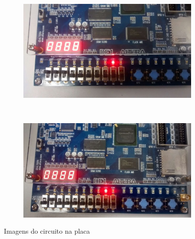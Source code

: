 \begin{figure}
	\begin{subfigure}[b]{0.44\textwidth}
        \includegraphics[width=\textwidth]{img/cenario2/circ7}
        \label{fig:circ7}
    \end{subfigure}
    ~
    \begin{subfigure}[b]{0.44\textwidth}
        \includegraphics[width=\textwidth]{img/cenario2/circ8}
        \label{fig:circ8}
    \end{subfigure}


    \caption{Imagens do circuito na placa}\label{fig:fotosCircuito}
\end{figure}


